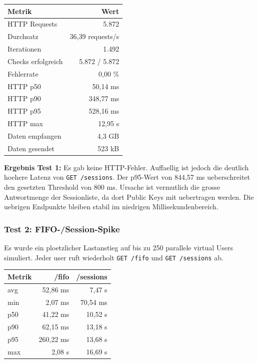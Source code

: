 \begin{table}[h]
\centering
\begin{tabular}{|l|r|}
\hline
\textbf{Metrik} & \textbf{Wert} \\
\hline
HTTP Requests & 5.872 \\
\hline
Durchsatz & 36,39 requests/s \\
\hline
Iterationen & 1.492 \\
\hline
Checks erfolgreich & 5.872 / 5.872 \\
\hline
Fehlerrate & 0,00 \% \\
\hline
HTTP p50 & 50,14 ms \\
\hline
HTTP p90 & 348,77 ms \\
\hline
HTTP p95 & 528,16 ms \\
\hline
HTTP max & 12,95 s \\
\hline
Daten empfangen & 4,3 GB \\
\hline
Daten gesendet & 523 kB \\
\hline
\end{tabular}
\end{table}

\textbf{Ergebnis Test 1:}
Es gab keine HTTP-Fehler. Auffaellig ist jedoch die deutlich hoehere Latenz von \texttt{GET /sessions}. Der p95-Wert von 844,57 ms ueberschreitet den gesetzten Threshold von 800 ms. Ursache ist vermutlich die grosse Antwortmenge der Sessionliste, da dort Public Keys mit uebertragen werden. Die uebrigen Endpunkte bleiben stabil im niedrigen Millisekundenbereich.

\subsubsection{Test 2: FIFO-/Session-Spike}
Es wurde ein ploetzlicher Lastanstieg auf bis zu 250 parallele virtual Users simuliert. Jeder user ruft wiederholt \texttt{GET /fifo} und \texttt{GET /sessions} ab.

\begin{table}[h]
\centering
\begin{tabular}{|l|r|r|}
\hline
\textbf{Metrik} & \textbf{/fifo} & \textbf{/sessions} \\
\hline
avg & 52,86 ms & 7,47 s \\
\hline
min & 2,07 ms & 70,54 ms \\
\hline
p50 & 41,22 ms & 10,52 s \\
\hline
p90 & 62,15 ms & 13,18 s \\
\hline
p95 & 260,22 ms & 13,68 s \\
\hline
max & 2,08 s & 16,69 s \\
\hline
\end{tabular}
\end{table}

